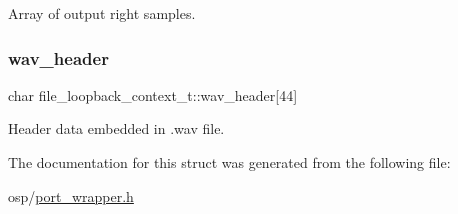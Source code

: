 Array of output right samples. 

\mbox{\label{structfile__loopback__context__t_a87d194451bfb9775cb4ad94f6706f02b}} 
\subsubsection{\texorpdfstring{wav\+\_\+header}{wav\_header}}
{\footnotesize\ttfamily char file\+\_\+loopback\+\_\+context\+\_\+t\+::wav\+\_\+header\mbox{[}44\mbox{]}}



Header data embedded in .wav file. 



The documentation for this struct was generated from the following file\+:\begin{DoxyCompactItemize}
\item 
osp/\mbox{\hyperlink{port__wrapper_8h}{port\+\_\+wrapper.\+h}}\end{DoxyCompactItemize}
